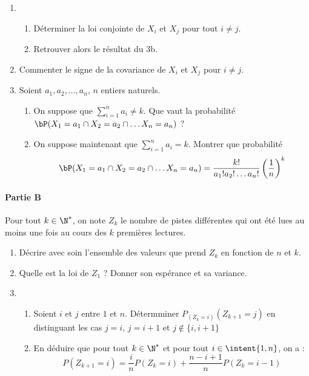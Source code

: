 \begin{probleme}
\begin{enumerate}
\begin{enumerate}
\end{enumerate}
\item \begin{enumerate}
\item Déterminer la loi conjointe de $X_i $ et $X_j$ pour tout $i\neq j$. 

\item  Retrouver alors le résultat du 3b. 

\end{enumerate}
\item Commenter le signe de la covariance de $X_i$ et $X_j$ pour $i\neq j$. 



\item Soient $a_1, a_2, \dots, a_n$, $n$ entiers naturels. 
\begin{enumerate}
\item On suppose que $\sum_{i=1}^n a_i \neq k$. Que vaut la probabilité 
$\bP(X_1 =a_1 \cap X_2 =a_2 \cap \dots X_n =a_n)$ ? 

\item On suppose maintenant  que $\sum_{i=1}^n a_i = k$. Montrer que probabilité 
$$\bP(X_1 =a_1 \cap X_2 =a_2 \cap \dots X_n =a_n) = \frac{k!}{a_1! a_2! \dots a_n ! } \left( \frac{1}{n}\right)^k$$ 

\end{enumerate}
\end{enumerate}


\paragraph{Partie B}
\noindent 

Pour tout $k\in \N^*$, on note $Z_k$ le nombre de pistes différentes qui ont été lues au moins une fois au cours des $k$ premières lectures. 
\begin{enumerate}
\item Décrire avec soin l'ensemble des valeurs que prend $Z_k$ en fonction de $n$ et $k$. 


\item Quelle est la loi de $Z_1$ ? Donner son espérance et sa variance. 


\item \begin{enumerate}
\item Soient $i$  et $j$  entre $1$ et $n$. Détermminer $P_{(Z_k =i) } (Z_{k+1} =j)$ en distinguant les cas $j=i$, $j=i+1$ et $j\notin \{ i, i+1\}$


\item En déduire que pour tout $k\in \N^*$ et pour tout $i\in \intent{1, n}$, on a : 
$$P(Z_{k+1}  =i )= \frac{i}{n} P(Z_k =i ) + \frac{n-i+1}{n} P(Z_k =i-1)$$


\end{enumerate}
\end{enumerate}
\end{probleme}
